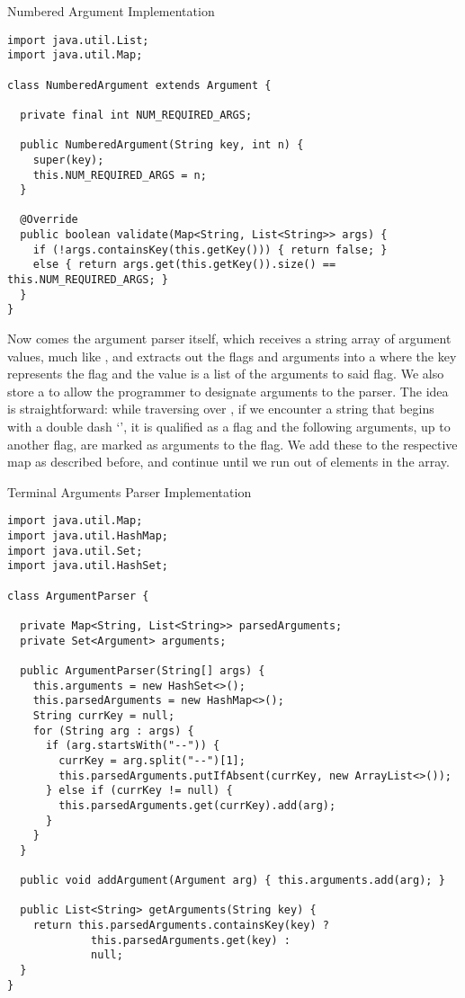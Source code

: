 \begin{cl}[]{Numbered Argument Implementation}
\begin{lstlisting}[language=MyJava]
import java.util.List;
import java.util.Map;

class NumberedArgument extends Argument {

  private final int NUM_REQUIRED_ARGS;

  public NumberedArgument(String key, int n) {
    super(key);
    this.NUM_REQUIRED_ARGS = n;
  }

  @Override
  public boolean validate(Map<String, List<String>> args) {
    if (!args.containsKey(this.getKey())) { return false; } 
    else { return args.get(this.getKey()).size() == this.NUM_REQUIRED_ARGS; }
  }
}
\end{lstlisting}
\end{cl}

Now comes the argument parser itself, which receives a string array of argument values, much like , and extracts out the flags and arguments into a  where the key represents the flag and the value is a list of the arguments to said flag. We also store a  to allow the programmer to designate arguments to the parser. The idea is straightforward: while traversing over , if we encounter a string that begins with a double dash `\ttt{--}', it is qualified as a flag and the following arguments, up to another flag, are marked as arguments to the flag. We add these to the respective map as described before, and continue until we run out of elements in the array.

\begin{cl}[]{Terminal Arguments Parser Implementation}
\begin{lstlisting}[language=MyJava]
import java.util.Map;
import java.util.HashMap;
import java.util.Set;
import java.util.HashSet;

class ArgumentParser {

  private Map<String, List<String>> parsedArguments;
  private Set<Argument> arguments;

  public ArgumentParser(String[] args) {
    this.arguments = new HashSet<>();
    this.parsedArguments = new HashMap<>();
    String currKey = null;
    for (String arg : args) {
      if (arg.startsWith("--")) {
        currKey = arg.split("--")[1];
        this.parsedArguments.putIfAbsent(currKey, new ArrayList<>());
      } else if (currKey != null) {
        this.parsedArguments.get(currKey).add(arg);
      }
    }
  }

  public void addArgument(Argument arg) { this.arguments.add(arg); }

  public List<String> getArguments(String key) {
    return this.parsedArguments.containsKey(key) ? 
             this.parsedArguments.get(key) : 
             null;
  }
}
\end{lstlisting}
\end{cl}

